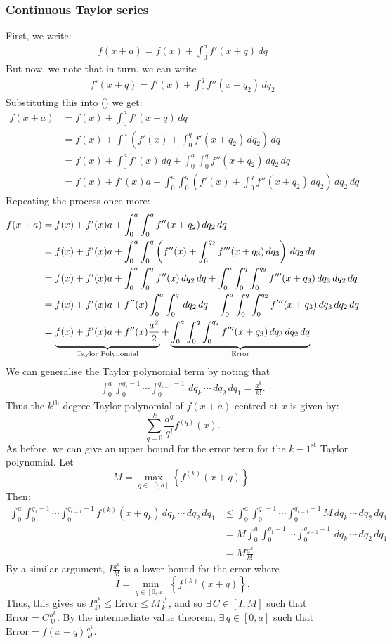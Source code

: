 \documentclass{article}
\theoremstyle{definition}
\begin{document}
\subsubsection{Continuous Taylor series}
First, we write:
\begin{align*}
	f(x+a)=f(x)+\int_0^af'(x+q)\,dq
\end{align*}
But now, we note that in turn, we can write 
\begin{align*}
	f'(x+q)=f'(x)+\int_0^qf''(x+q_2)\,dq_2
\end{align*}
Substituting this into () we get:
\begin{align*}
	f(x+a)&=f(x)+\int_0^af'(x+q)\,dq\\
	&=f(x)+\int_0^a\left(f'(x)+\int_0^qf'(x+q_2)\,dq_2\right)\,dq\\
	&=f(x)+\int_0^af'(x)\,dq+\int_0^a\int_0^qf''(x+q_2)\,dq_2\,dq\\
	&=f(x)+f'(x)a+\int_0^a\int_0^q\left(f'(x)+\int_0^qf''(x+q_2)\,dq_2\right)\,dq_2\,dq
\end{align*}
Repeating the process once more:
\begin{align*}
	f(x+a)&=f(x)+f'(x)a+\int_0^a\int_0^qf''(x+q_2)\,dq_2\,dq\\
	&=f(x)+f'(x)a+\int_0^a\int_0^q\left(f''(x)+\int_0^{q_2}f'''(x+q_3)\,dq_3\right)\,dq_2\,dq\\
	&=f(x)+f'(x)a+\int_0^a\int_0^qf''(x)\,dq_2\,dq+\int_0^a\int_0^q\int_0^{q_2}f'''(x+q_3)\,dq_3\,dq_2\,dq\\
	&=f(x)+f'(x)a+f''(x)\int_0^a\int_0^q\,dq_2\,dq+\int_0^a\int_0^q\int_0^{q_2}f'''(x+q_3)\,dq_3\,dq_2\,dq\\
	&=\underbrace{\vphantom{\int_0^a}f(x)+f'(x)a+f''(x)\frac{a^2}{2}}_{\text{\normalfont Taylor Polynomial}}+\underbrace{\int_0^a\int_0^q\int_0^{q_2}f'''(x+q_3)\,dq_3\,dq_2\,dq}_{\text{\normalfont Error}}
\end{align*}
We can generalise the Taylor polynomial term by noting that 
\begin{align*}
	\int_0^a\int_0^{q_1-1}\cdots\int_0^{q_{k-1}-1}\,dq_k\,\cdots\,dq_2\,dq_1=\frac{a^k}{k!}.
\end{align*}
Thus the $k^\text{th}$ degree Taylor polynomial of $f(x+a)$ centred at $x$ is given by:
\[\sum_{q=0}^k\frac{a^q}{q!}f^{(q)}(x).\]
As before, we can give an upper bound for the error term for the $k-1^\text{st}$ Taylor polynomial. Let \[M=\max_{q\in[0,a]}\left\{f^{(k)}(x+q)\right\}.\] Then: 
\begin{align*}
	\int_0^a\int_0^{q_1-1}\cdots\int_0^{q_{k-1}-1}f^{(k)}(x+q_k)\,dq_k\,\cdots\,dq_2\,dq_1&\leq\int_0^a\int_0^{q_1-1}\cdots\int_0^{q_{k-1}-1}M\,dq_k\,\cdots\,dq_2\,dq_1\\
	&=M\int_0^a\int_0^{q_1-1}\cdots\int_0^{q_{k-1}-1}\,dq_k\,\cdots\,dq_2\,dq_1\\
	&=M\frac{a^k}{k!}
\end{align*}
By a similar argument, $I\frac{a^k}{k!}$ is a lower bound for the error where \[I=\min_{q\in[0,a]}\left\{f^{(k)}(x+q)\right\}.\]
Thus, this gives us $I\frac{a^k}{k!}\leq\text{Error}\leq M\frac{a^k}{k!}$, and so $\exists\,C\in[I,M]$ such that $\text{Error}=C\frac{a^k}{k!}$. By the intermediate value theorem, $\exists\,q\in[0,a]$ such that $\text{Error}=f(x+q)\frac{a^k}{k!}$.
\end{document}
